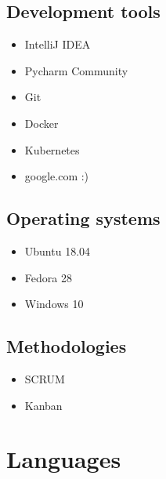 \documentclass[12pt,a4paper,sans]{moderncv}        %
\begin{document}
\subsection{Development tools}
\vspace{-10pt}
\begin{multicols}{2}
\begin{itemize}\setlength{\itemsep}{-5pt}%
\item IntelliJ IDEA
\item Pycharm Community
\item Git 
\item Docker
\item Kubernetes
\item google.com :)
\end{itemize}
\end{multicols}

\vspace{-10pt}
\subsection{Operating systems}
\vspace{-10pt}
\begin{multicols}{2}
\begin{itemize}\setlength{\itemsep}{-5pt}%
\item Ubuntu 18.04 
\item Fedora 28
\item Windows 10
\end{itemize}
\end{multicols}
\vspace{-10pt}
\subsection{Methodologies}
\vspace{-10pt}
\begin{multicols}{2}
\begin{itemize}\setlength{\itemsep}{-5pt}%
\item SCRUM
\item Kanban 
\end{itemize}
\end{multicols}

\vspace{-10pt}

\section{Languages}
\end{document}
